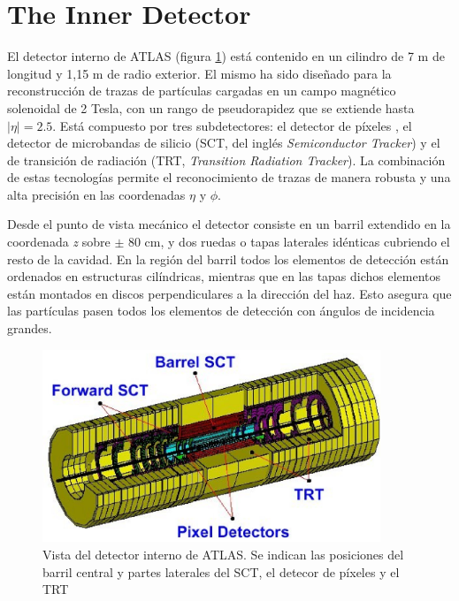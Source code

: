 \section{The Inner Detector}\label{sec:atlasID}
El detector interno de ATLAS (figura \ref{fig:figinner}) est\'a contenido en un cilindro de 7 m de longitud y 1,15 m de radio exterior. El mismo ha sido dise\~nado para la reconstrucci\'on de trazas de part\'iculas cargadas en un campo magn\'etico solenoidal de 2 Tesla, con un rango de pseudorapidez que se extiende hasta $|\eta|=  2.5$. Est\'a compuesto por tres subdetectores: el  detector de p\'ixeles , el detector de microbandas de silicio (SCT, del ingl\'es \emph{Semiconductor Tracker}) y el de transici\'on de radiaci\'on (TRT, \emph{Transition Radiation Tracker}).  La combinaci\'on de estas tecnolog\'ias permite el reconocimiento de trazas de manera robusta y una alta precisi\'on en las coordenadas $\eta$ y $\phi$.  

   Desde el punto de vista mec\'anico el detector consiste en un barril extendido en la coordenada \emph{z} sobre $\pm$ 80 cm, y dos ruedas o tapas laterales id\'enticas cubriendo el resto de la cavidad. En la regi\'on del barril todos los elementos de detecci\'on est\'an ordenados en estructuras cil\'indricas, mientras que en las tapas dichos elementos est\'an montados en discos perpendiculares a la direcci\'on del haz. Esto asegura que las part\'iculas pasen todos los elementos de detecci\'on con \'angulos de incidencia grandes.

\begin{figure}[htbp]
  \begin{center}
      \includegraphics[width=0.9\textwidth]{Fig2/innnerdetector3d.eps}
    \caption{Vista del detector interno de ATLAS. Se indican las posiciones del barril central y partes laterales del SCT, el detecor de p\'ixeles y el TRT}
    \label{fig:figinner}
  \end{center}
\end{figure}

